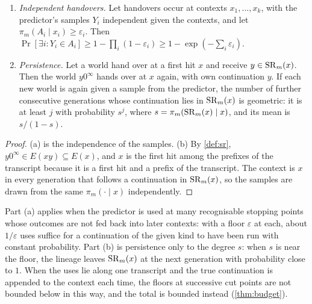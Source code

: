 \begin{proposition}\label{prop:lineage}
\begin{enumerate}[label=(\alph*),leftmargin=2em,itemsep=2pt,topsep=2pt]
\item \emph{Independent handovers.} Let handovers occur at contexts $x_1,\dots,x_k$, with the predictor's
samples $Y_i$ independent given the contexts, and let $\pi_m(A_i\mid x_i)\ge\varepsilon_i$. Then
$\Pr[\exists i:Y_i\in A_i]\ge1-\prod_i(1-\varepsilon_i)\ge1-\exp(-\sum_i\varepsilon_i)$.
\item \emph{Persistence.} Let a world hand over at a first hit $x$ and receive $y\in\mathrm{SR}_m(x)$. Then the world
$y0^\infty$ hands over at $x$ again, with own continuation $y$. If each new world is again given a sample from
the predictor, the number of further consecutive generations whose continuation lies in $\mathrm{SR}_m(x)$ is geometric:
it is at least $j$ with probability $s^j$, where $s=\pi_m(\mathrm{SR}_m(x)\mid x)$, and its mean is $s/(1-s)$.
\end{enumerate}
\end{proposition}
\begin{proof}
(a) is the independence of the samples. (b) By \cref{def:sr}, $y0^\infty\in E(xy)\subseteq E(x)$, and $x$ is
the first hit among the prefixes of the transcript because it is a first hit and a prefix of the transcript.
The context is $x$ in every generation that follows a continuation in $\mathrm{SR}_m(x)$, so the samples are drawn
from the same $\pi_m(\cdot\mid x)$ independently.
\end{proof}

Part (a) applies when the predictor is used at many recognisable stopping points whose outcomes are not fed
back into later contexts: with a floor $\varepsilon$ at each, about $1/\varepsilon$ uses suffice for a
continuation of the given kind to have been run with constant probability. Part (b) is persistence only to
the degree $s$: when $s$ is near the floor, the lineage leaves $\mathrm{SR}_m(x)$ at the next generation with
probability close to $1$. When the uses lie along one transcript and the true continuation is appended to the
context each time, the floors at successive cut points are not bounded below in this way, and the total is
bounded instead (\cref{thm:budget}).
